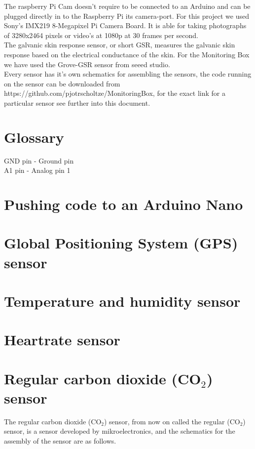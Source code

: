 \documentclass{report}
\begin{document}
The raspberry Pi Cam doesn't require to be connected to an Arduino and can be plugged directly in to the Raspberry Pi its camera-port. For this project we used Sony's IMX219 8-Megapixel Pi Camera Board. It is able for taking photographs of 3280x2464 pixels or video's at 1080p at 30 frames per second. \\

The galvanic skin response sensor, or short GSR, measures the galvanic skin response based on the electrical conductance of the skin. For the Monitoring Box we have used the Grove-GSR sensor from seeed studio.\\

Every sensor has it's own schematics for assembling the sensors, the code running on the sensor can be downloaded from https://github.com/pjotrscholtze/MonitoringBox, for the exact link for a particular sensor see further into this document.  


\chapter{Glossary}

GND pin - Ground pin \\
A1 pin - Analog pin 1

\chapter{Pushing code to an Arduino Nano}

\chapter{Global Positioning System (GPS) sensor}

\chapter{Temperature and humidity sensor}

\chapter{Heartrate sensor}

\chapter{Regular carbon dioxide (CO$_2$) sensor}
The regular carbon dioxide (CO$_2$) sensor, from now on called the regular (CO$_2$) sensor, is a sensor developed by mikroelectronics, and the schematics for the assembly of the sensor are as follows. \\
\end{document}
